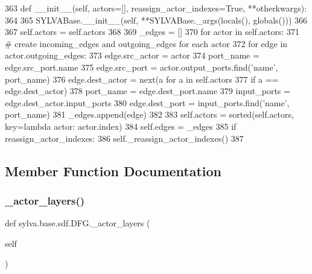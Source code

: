 \begin{DoxyCode}
363     \textcolor{keyword}{def }\_\_init\_\_(self, actors=[], reassign\_actor\_indexes=True, **otherkwargs):
364 
365         SYLVABase.\_\_init\_\_(self, **SYLVABase.\_args(locals(), globals()))
366 
367         self.actors = self.actors
368 
369         \_edges = []
370         \textcolor{keywordflow}{for} actor \textcolor{keywordflow}{in} self.actors:
371             \textcolor{comment}{# create incoming\_edges and outgoing\_edges for each actor}
372             \textcolor{keywordflow}{for} edge \textcolor{keywordflow}{in} actor.outgoing\_edges:
373                 edge.src\_actor = actor
374                 port\_name = edge.src\_port.name
375                 edge.src\_port = actor.output\_ports.find(\textcolor{stringliteral}{'name'}, port\_name)
376                 edge.dest\_actor = next(a \textcolor{keywordflow}{for} a \textcolor{keywordflow}{in} self.actors
377                                        \textcolor{keywordflow}{if} a == edge.dest\_actor)
378                 port\_name = edge.dest\_port.name
379                 input\_ports = edge.dest\_actor.input\_ports
380                 edge.dest\_port = input\_ports.find(\textcolor{stringliteral}{'name'}, port\_name)
381                 \_edges.append(edge)
382 
383         self.actors = sorted(self.actors, key=\textcolor{keyword}{lambda} actor: actor.index)
384         self.edges = \_edges
385         \textcolor{keywordflow}{if} reassign\_actor\_indexes:
386             self.\_reassign\_actor\_indexes()
387 
\end{DoxyCode}


\subsection{Member Function Documentation}
\mbox{\label{classsylva_1_1base_1_1sdf_1_1_d_f_g_a1e8c55f1e1a5cc595466e7b3bf3fd409}} 
\subsubsection{\texorpdfstring{\+\_\+actor\+\_\+layers()}{\_actor\_layers()}}
{\footnotesize\ttfamily def sylva.\+base.\+sdf.\+D\+F\+G.\+\_\+actor\+\_\+layers (\begin{DoxyParamCaption}\item[{}]{self }\end{DoxyParamCaption})\hspace{0.3cm}{\ttfamily [private]}}



